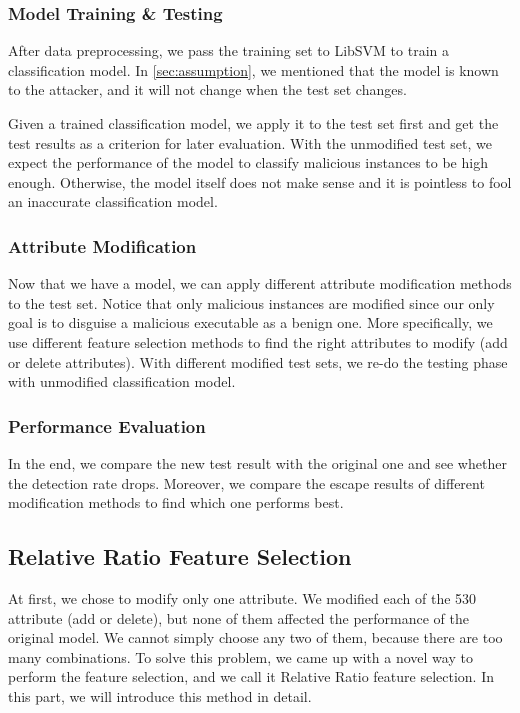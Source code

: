 \documentclass[11pt]{article}
\begin{document}
\subsubsection{Model Training \& Testing}
After data preprocessing, we pass the training set to LibSVM to train a classification model. In \ref{sec:assumption}, we mentioned that the model is known to the attacker, and it will not change when the test set changes. %

Given a trained classification model, we apply it to the test set first and get the test results as a criterion for later evaluation. With the unmodified test set, we expect the performance of the model to classify malicious instances to be high enough. Otherwise, the model itself does not make sense and it is pointless to fool an inaccurate classification model.


\subsubsection{Attribute Modification}
Now that we have a model, we can apply different attribute modification methods to the test set. Notice that only malicious instances are modified since our only goal is to disguise a malicious executable as a benign one. More specifically, we use different feature selection methods to find the right attributes to modify (add or delete attributes). With different modified test sets, we re-do the testing phase with unmodified classification model. 

\subsubsection{Performance Evaluation}
In the end, we compare the new test result with the original one and see whether the detection rate drops. Moreover, we compare the escape results of different modification methods to find which one performs best. 

\subsection{Relative Ratio Feature Selection}
At first, we chose to modify only one attribute. We modified each of the 530 attribute (add or delete), but none of them affected the performance of the original model. We cannot simply choose any two of them, because there are too many combinations. To solve this problem, we came up with a novel way to perform the feature selection, and we call it Relative Ratio feature selection. In this part, we will introduce this method in detail.
\end{document}
